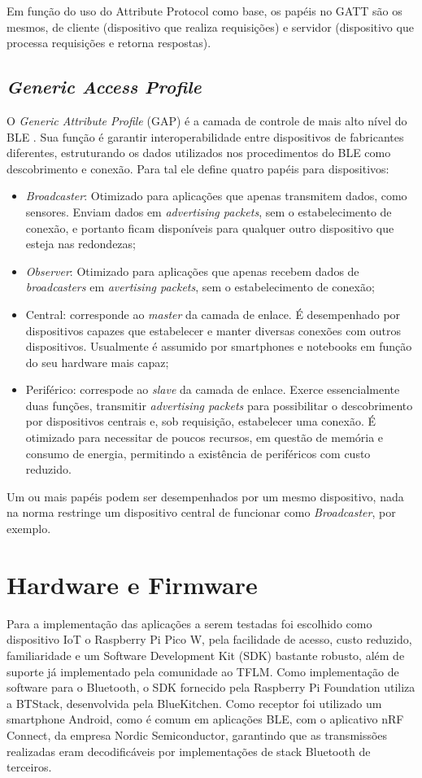 \documentclass[a5paper]{ufsc-thesis}  %
\begin{document}
Em função do uso do Attribute Protocol como base, os papéis no GATT são os mesmos, de cliente (dispositivo que realiza requisições) e servidor (dispositivo que processa requisições e retorna respostas).

\section{\textit{Generic Access Profile}}
O \textit{Generic Attribute Profile} (GAP) é a camada de controle de mais alto nível do BLE \cite{Townsend_2014}. Sua função é garantir interoperabilidade entre dispositivos de fabricantes diferentes, estruturando os dados utilizados nos procedimentos do BLE como descobrimento e conexão. Para tal ele define quatro papéis para dispositivos:
\begin{itemize}
    \item \textit{Broadcaster}: Otimizado para aplicações que apenas transmitem dados, como sensores. Enviam dados em \textit{advertising packets}, sem o estabelecimento de conexão, e portanto ficam disponíveis para qualquer outro dispositivo que esteja nas redondezas;
    \item \textit{Observer}: Otimizado para aplicações que apenas recebem dados de \textit{broadcasters} em \textit{avertising packets}, sem o estabelecimento de conexão;
    \item Central: corresponde ao \textit{master} da camada de enlace. É desempenhado por dispositivos capazes que estabelecer e manter diversas conexões com outros dispositivos. Usualmente é assumido por smartphones e notebooks em função do seu hardware mais capaz;
    \item Periférico: correspode ao \textit{slave} da camada de enlace. Exerce essencialmente duas funções, transmitir \textit{advertising packets} para possibilitar o descobrimento por dispositivos centrais e, sob requisição, estabelecer uma conexão. É otimizado para necessitar de poucos recursos, em questão de memória e consumo de energia, permitindo a existência de periféricos com custo reduzido.
\end{itemize}

Um ou mais papéis podem ser desempenhados por um mesmo dispositivo, nada na norma restringe um dispositivo central de funcionar como \textit{Broadcaster}, por exemplo.

\chapter{Hardware e Firmware}
Para a implementação das aplicações a serem testadas foi escolhido como dispositivo IoT o Raspberry Pi Pico W, pela facilidade de acesso, custo reduzido, familiaridade e um Software Development Kit (SDK) bastante robusto, além de suporte já implementado pela comunidade ao TFLM. Como implementação de software para o Bluetooth, o SDK fornecido pela Raspberry Pi Foundation utiliza a BTStack, desenvolvida pela BlueKitchen. Como receptor foi utilizado um smartphone Android, como é comum em aplicações BLE, com o aplicativo nRF Connect, da empresa Nordic Semiconductor, garantindo que as transmissões realizadas eram decodificáveis por implementações de stack Bluetooth de terceiros.
\end{document}
